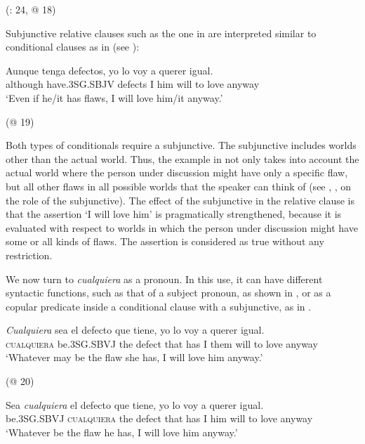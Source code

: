   (\citealt{Rizzosalierno2013}: 24, @ 18)
\z

Subjunctive relative clauses such as the one in  are interpreted similar to conditional clauses as in  (see \citealt{Quer2000}):


\ea %
\label{bkm:Ref513122} \gll Aunque tenga defectos, yo lo voy a querer igual.\\
although have.\textsc{3SG.SBJV} defects I him will to love anyway\\
  \glt ‘Even if he/it has flaws, I will love him/it anyway.’

  (@ 19)
\z

Both types of conditionals require a subjunctive. The subjunctive includes worlds other than the actual world. Thus, the example in  not only takes into account the actual world where the person under discussion might have only a specific flaw, but all other flaws in all possible worlds that the speaker can think of (see \citealt{Quer2000}, \citealt{Chierchia2006}, \citealt{Becker2014} on the role of the subjunctive). The effect of the subjunctive in the relative clause is that the assertion ‘I will love him’ is pragmatically strengthened, because it is evaluated with respect to worlds in which the person under discussion might have some or all kinds of flaws. The assertion is considered as true without any restriction.

We now turn to \textit{cualquiera} as a pronoun. In this use, it can have different syntactic functions, such as that of a subject pronoun, as shown in , or as a copular predicate inside a conditional clause with a subjunctive, as in .

\ea %
\label{bkm:Ref533761017} \gll \textit{Cualquiera} sea el defecto que tiene, yo lo voy a querer igual.\\
\textsc{cualquiera} be.\textsc{3SG.SBVJ} the defect that has I them will to love anyway\\
  \glt ‘Whatever may be the flaw she has, I will love him anyway.’

  (@ 20)
\z

\ea %
\label{bkm:Ref533761034} \gll Sea \textit{cualquiera} el defecto que tiene, yo lo voy a querer igual.\\
be.\textsc{3SG.SBVJ} \textsc{cualquiera} the defect that has I him will to love anyway\\
  \glt ‘Whatever be the flaw he has, I will love him anyway.’

